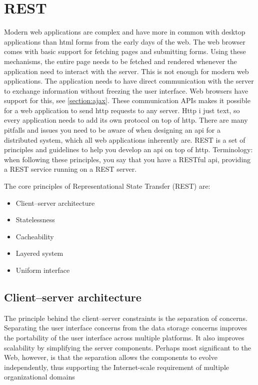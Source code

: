 \section{REST} \label{section:rest}
Modern web applications are complex and have more in common with desktop applications than html forms from the early days of the web. The web browser comes with basic support for fetching pages and submitting forms. Using these mechanisms, the entire page needs to be fetched and rendered whenever the application need to interact with the server. This is not enough for modern web applications. The application needs to have direct communication with the server to exchange information without freezing the user interface. Web browsers have support for this, see \ref{section:ajax}. These communication APIs makes it possible for a web application to send http requests to any server. Http i just text, so every application needs to add its own protocol on top of http. There are many pitfalls and issues you need to be aware of when designing an api for a distributed system, which all web applications inherently are. REST is a set of principles and guidelines to help you develop an api on top of http. Terminology: when following these principles, you say that you have a RESTful api, providing a REST service running on a REST server.

The core principles of Representational State Transfer (REST) are:
\begin{itemize}
\item Client–server architecture
\item Statelessness
\item Cacheability
\item Layered system
\item Uniform interface
\end{itemize}

\subsection{Client–server architecture}
The principle behind the client–server constraints is the separation of concerns. Separating the user interface concerns from the data storage concerns improves the portability of the user interface across multiple platforms. It also improves scalability by simplifying the server components. Perhaps most significant to the Web, however, is that the separation allows the components to evolve independently, thus supporting the Internet-scale requirement of multiple organizational domains

